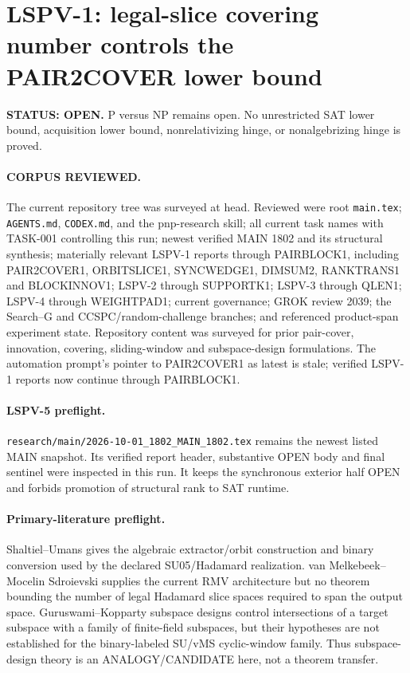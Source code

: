 \documentclass[11pt]{article}
\begin{document}
\section*{LSPV-1: legal-slice covering number controls the PAIR2COVER lower bound}
\textbf{STATUS: OPEN.} P versus NP remains open. No unrestricted SAT lower bound, acquisition lower bound, nonrelativizing hinge, or nonalgebrizing hinge is proved.

\paragraph{CORPUS REVIEWED.}
The current repository tree was surveyed at head. Reviewed were root \texttt{main.tex}; \texttt{AGENTS.md}, \texttt{CODEX.md}, and the pnp-research skill; all current task names with TASK-001 controlling this run; newest verified MAIN 1802 and its structural synthesis; materially relevant LSPV-1 reports through PAIRBLOCK1, including PAIR2COVER1, ORBITSLICE1, SYNCWEDGE1, DIMSUM2, RANKTRANS1 and BLOCKINNOV1; LSPV-2 through SUPPORTK1; LSPV-3 through QLEN1; LSPV-4 through WEIGHTPAD1; current governance; GROK review 2039; the Search--G and CCSPC/random-challenge branches; and referenced product-span experiment state. Repository content was surveyed for prior pair-cover, innovation, covering, sliding-window and subspace-design formulations. The automation prompt's pointer to PAIR2COVER1 as latest is stale; verified LSPV-1 reports now continue through PAIRBLOCK1.

\paragraph{LSPV-5 preflight.}
\texttt{research/main/2026-10-01\_1802\_MAIN\_1802.tex} remains the newest listed MAIN snapshot. Its verified report header, substantive OPEN body and final sentinel were inspected in this run. It keeps the synchronous exterior half OPEN and forbids promotion of structural rank to SAT runtime.

\paragraph{Primary-literature preflight.}
Shaltiel--Umans gives the algebraic extractor/orbit construction and binary conversion used by the declared SU05/Hadamard realization. van Melkebeek--Mocelin Sdroievski supplies the current RMV architecture but no theorem bounding the number of legal Hadamard slice spaces required to span the output space. Guruswami--Kopparty subspace designs control intersections of a target subspace with a family of finite-field subspaces, but their hypotheses are not established for the binary-labeled SU/vMS cyclic-window family. Thus subspace-design theory is an ANALOGY/CANDIDATE here, not a theorem transfer.
\end{document}
